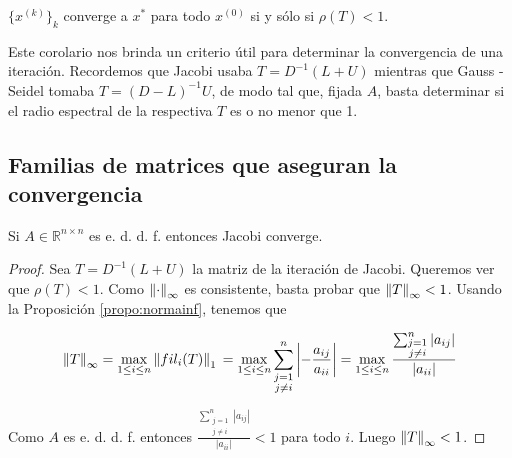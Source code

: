 \begin{coro}
$\{x^{(k)}\}_k$ converge a $x^*$ para todo $x^{(0)}$ si y sólo si $\rho(T) < 1$.
\end{coro}

Este corolario nos brinda un criterio útil para determinar la convergencia de una iteración. Recordemos que Jacobi usaba $T = D^{-1}(L + U)$ mientras que Gauss - Seidel tomaba $T = (D - L)^{-1}U$, de modo tal que, fijada $A$, basta determinar si el radio espectral de la respectiva $T$ es o no menor que 1.

\subsection{Familias de matrices que aseguran la convergencia}

\begin{propo}
Si $A \in \mathbb{R}^{n \times n}$ es e. d. d. f. entonces Jacobi converge.

\begin{proof}
Sea $T = D^{-1}(L + U)$ la matriz de la iteración de Jacobi. Queremos ver que $\rho(T) < 1$. Como $\left\lVert\cdot\right\rVert_{\infty}$ es consistente, basta probar que $\left\lVert T\right\rVert_{\infty} < 1$. Usando la Proposición \ref{propo:normainf}, tenemos que

\[\left\lVert T\right\rVert_{\infty} = \max\limits_{1 \leq i \leq n}\left\lVert fil_i(T)\right\rVert_1\\ = \max\limits_{1 \leq i \leq n}\sum_{\substack{j = 1\\j \neq i}}^n \left|-\frac{a_{ij}}{a_{ii}}\right| = \max\limits_{1 \leq i \leq n}\frac{\sum_{\substack{j = 1\\j \neq i}}^n |a_{ij}|}{|a_{ii}|}\]

Como $A$ es e. d. d. f. entonces $\frac{\sum_{\substack{j = 1\\j \neq i}}^n |a_{ij}|}{|a_{ii}|} < 1$ para todo $i$. Luego $\left\lVert T\right\rVert_{\infty} < 1$.

\end{proof}
\end{propo}

